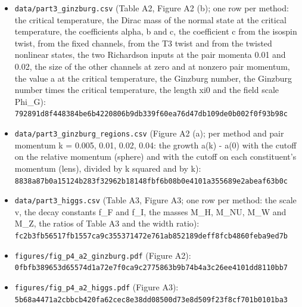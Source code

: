 \documentclass[
  10pt,
]{article}
\providecommand{\tightlist}{%
  \setlength{\itemsep}{0pt}\setlength{\parskip}{0pt}}
\begin{document}
\begin{itemize}
\tightlist
\item
  \texttt{data/part3\_ginzburg.csv} (Table A2, Figure A2 (b); one row
  per method: the critical temperature, the Dirac mass of the normal
  state at the critical temperature, the coefficients alpha, b and c,
  the coefficient c from the isospin twist, from the fixed channels,
  from the T3 twist and from the twisted nonlinear states, the two
  Richardson inputs at the pair momenta 0.01 and 0.02, the size of the
  other channels at zero and at nonzero pair momentum, the value a at
  the critical temperature, the Ginzburg number, the Ginzburg number
  times the critical temperature, the length xi0 and the field scale
  Phi\_G):\\
  \texttt{792891d8f448384be6b4220806b9db339f60ea76d47db109de0b002f0f93b98c}
\item
  \texttt{data/part3\_ginzburg\_regions.csv} (Figure A2 (a); per method
  and pair momentum k = 0.005, 0.01, 0.02, 0.04: the growth a(k) - a(0)
  with the cutoff on the relative momentum (sphere) and with the cutoff
  on each constituent's momentum (lens), divided by k squared and by
  k):\\
  \texttt{8838a87b0a15124b283f32962b18148fbf6b08b0e4101a355689e2abeaf63b0c}
\item
  \texttt{data/part3\_higgs.csv} (Table A3, Figure A3; one row per
  method: the scale v, the decay constants f\_F and f\_I, the masses
  M\_H, M\_NU, M\_W and M\_Z, the ratios of Table A3 and the width
  ratio):\\
  \texttt{fc2b3fb56517fb1557ca9c355371472e761ab852189deff8fcb4860feba9ed7b}
\item
  \texttt{figures/fig\_p4\_a2\_ginzburg.pdf} (Figure A2):\\
  \texttt{0fbfb389653d65574d1a72e7f0ca9c2775863b9b74b4a3c26ee4101dd8110bb7}
\item
  \texttt{figures/fig\_p4\_a2\_higgs.pdf} (Figure A3):\\
  \texttt{5b68a4471a2cbbcb420fa62cec8e38dd08500d73e8d509f23f8cf701b0101ba3}
\end{itemize}
\end{document}
